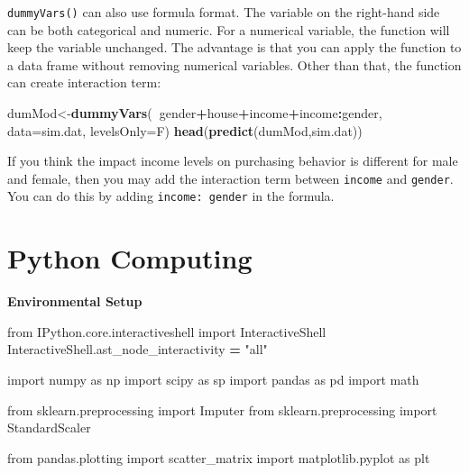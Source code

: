 \documentclass[12pt,]{krantz}
\makeatletter
\newenvironment{Shaded}{\begin{snugshade}}{\end{snugshade}}
\newcommand{\KeywordTok}[1]{\textcolor[rgb]{0.27,0.27,0.27}{\textbf{#1}}}
\newcommand{\DataTypeTok}[1]{\textcolor[rgb]{0.27,0.27,0.27}{#1}}
\newcommand{\StringTok}[1]{\textcolor[rgb]{0.5,0.5,0.5}{#1}}
\newcommand{\ImportTok}[1]{#1}
\newcommand{\OperatorTok}[1]{\textcolor[rgb]{0.43,0.43,0.43}{\textbf{#1}}}
\newcommand{\NormalTok}[1]{#1}
\newenvironment{kframe}{%
\medskip{}
\setlength{\fboxsep}{.8em}
 \def\at@end@of@kframe{}%
 \ifinner\ifhmode%
  \def\at@end@of@kframe{\end{minipage}}%
  \begin{minipage}{\columnwidth}%
 \fi\fi%
 \def\FrameCommand##1{\hskip\@totalleftmargin \hskip-\fboxsep
 \colorbox{shadecolor}{##1}\hskip-\fboxsep
     \hskip-\linewidth \hskip-\@totalleftmargin \hskip\columnwidth}%
 \MakeFramed {\advance\hsize-\width
   \@totalleftmargin\z@ \linewidth\hsize
   \@setminipage}}%
 {\par\unskip\endMakeFramed%
 \at@end@of@kframe}
\renewenvironment{Shaded}{\begin{kframe}}{\end{kframe}}
\theoremstyle{definition}
\theoremstyle{definition}
\theoremstyle{definition}
\theoremstyle{remark}
\makeatother
\begin{document}
\texttt{dummyVars()} can also use formula format. The variable on the
right-hand side can be both categorical and numeric. For a numerical
variable, the function will keep the variable unchanged. The advantage
is that you can apply the function to a data frame without removing
numerical variables. Other than that, the function can create
interaction term:

\begin{Shaded}
\begin{Highlighting}[]
\NormalTok{dumMod<-}\KeywordTok{dummyVars}\NormalTok{(}\OperatorTok{~}\NormalTok{gender}\OperatorTok{+}\NormalTok{house}\OperatorTok{+}\NormalTok{income}\OperatorTok{+}\NormalTok{income}\OperatorTok{:}\NormalTok{gender,}
                  \DataTypeTok{data=}\NormalTok{sim.dat,}
                  \DataTypeTok{levelsOnly=}\NormalTok{F)}
\KeywordTok{head}\NormalTok{(}\KeywordTok{predict}\NormalTok{(dumMod,sim.dat))}
\end{Highlighting}
\end{Shaded}

If you think the impact income levels on purchasing behavior is
different for male and female, then you may add the interaction term
between \texttt{income} and \texttt{gender}. You can do this by adding
\texttt{income:\ gender} in the formula.

\section{Python Computing}\label{python-computing}

\textbf{Environmental Setup}

\begin{Shaded}
\begin{Highlighting}[]
\ImportTok{from}\NormalTok{ IPython.core.interactiveshell }\ImportTok{import}\NormalTok{ InteractiveShell}
\NormalTok{InteractiveShell.ast_node_interactivity }\OperatorTok{=} \StringTok{"all"}

\ImportTok{import}\NormalTok{ numpy }\ImportTok{as}\NormalTok{ np}
\ImportTok{import}\NormalTok{ scipy }\ImportTok{as}\NormalTok{ sp}
\ImportTok{import}\NormalTok{ pandas }\ImportTok{as}\NormalTok{ pd}
\ImportTok{import}\NormalTok{ math}

\ImportTok{from}\NormalTok{ sklearn.preprocessing }\ImportTok{import}\NormalTok{ Imputer}
\ImportTok{from}\NormalTok{ sklearn.preprocessing }\ImportTok{import}\NormalTok{ StandardScaler}

\ImportTok{from}\NormalTok{ pandas.plotting }\ImportTok{import}\NormalTok{ scatter_matrix}
\ImportTok{import}\NormalTok{ matplotlib.pyplot }\ImportTok{as}\NormalTok{ plt}
\end{Highlighting}
\end{Shaded}
\end{document}
